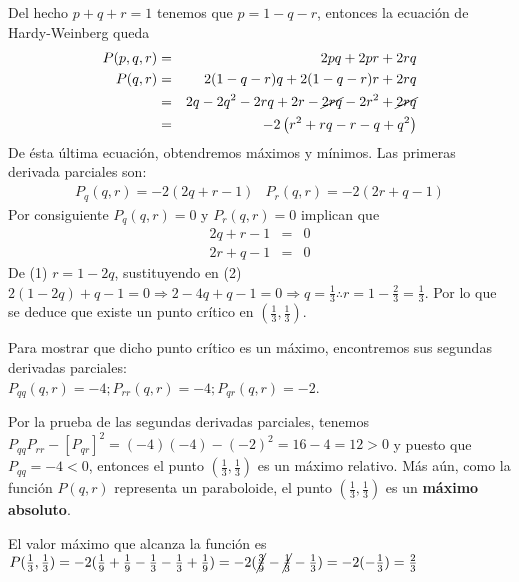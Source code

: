 \documentclass{article}
\begin{document}
\begin{enumerate}
{                \color{azul}
                Del hecho $p+q+r=1$ tenemos que $p=1-q-r$, entonces la ecuación de
                Hardy-Weinberg queda
                \begin{eqnarray*}
                    P(p,q,r) & = & 2pq+2pr+2rq\\
                    P(q,r)   & = & 2(1-q-r)q+2(1-q-r)r+2rq\\
                             & = & 2q-2q^2-2rq+2r-\cancel{2rq}-2r^2+\cancel{2rq}\\
                             & = & -2\left(r^2+rq-r-q+q^2\right)
                \end{eqnarray*}
                De ésta última ecuación, obtendremos máximos y mínimos. Las primeras derivada
                parciales son:
                \begin{eqnarray*}
                    P_q(q,r)=-2\left(2q+r-1\right) &
                    P_r(q,r)=-2\left(2r+q-1\right)
                \end{eqnarray*}
                Por consiguiente $P_q(q,r)=0$ y $P_r(q,r)=0$ implican que
                \begin{eqnarray}
                    2q+r-1 & = & 0\\
                    2r+q-1 & = & 0
                \end{eqnarray}
                De (1) $r=1-2q$, sustituyendo en (2) $2(1-2q)+q-1=0 \Rightarrow 2-4q+q-1=0
                \Rightarrow q=\frac{1}{3} \therefore r=1-\frac{2}{3}=\frac{1}{3}$. Por lo
                que se deduce que existe un punto crítico en $(\frac{1}{3},\frac{1}{3})$.

                Para mostrar que dicho punto crítico es un máximo, encontremos sus segundas
                derivadas parciales:\\$P_{qq}(q,r)=-4;P_{rr}(q,r)=-4;P_{qr}(q,r)=-2$.

                Por la prueba de las segundas derivadas parciales, tenemos
                $P_{qq}P_{rr}-[P_{qr}]^2=(-4)(-4)-(-2)^2=16-4=12>0$ y puesto que $P_{qq}=-4<0$,
                entonces el punto $(\frac{1}{3},\frac{1}{3})$ es un máximo relativo. Más aún,
                como la función $P(q,r)$ representa un paraboloide, el punto $(\frac{1}{3},
                \frac{1}{3})$ es un {\bf máximo absoluto}.

                El valor máximo que alcanza la función es $P(\frac{1}{3},\frac{1}{3})=
                -2(\frac{1}{9}+\frac{1}{9}-\frac{1}{3}-\frac{1}{3}+\frac{1}{9})=
                -2(\cancel{\frac{3}{9}}-\cancel{\frac{1}{3}}-\frac{1}{3})=
                -2(-\frac{1}{3})=\frac{2}{3}$

}
\end{enumerate}
\end{document}
